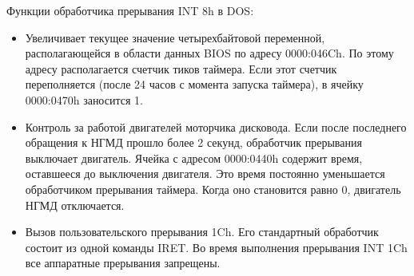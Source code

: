 Функции обработчика прерывания INT 8h в DOS:

\begin{itemize}
	\item Увеличивает текущее значение четырехбайтовой переменной, располагающейся в области данных BIOS по адресу 0000:046Ch. По этому адресу располагается счетчик тиков таймера. Если этот счетчик переполняется (после 24 часов с момента запуска таймера), в ячейку 0000:0470h заносится 1.
	\item Контроль за работой двигателей моторчика дисковода. Если после последнего обращения к НГМД прошло более 2 секунд, обработчик прерывания выключает двигатель. Ячейка с адресом 0000:0440h содержит время, оставшееся до выключения двигателя. Это время постоянно уменьшается обработчиком прерывания таймера. Когда оно становится равно 0, двигатель НГМД отключается.
	\item Вызов пользовательского прерывания 1Ch. Его стандартный обработчик состоит из одной команды IRET. Во время выполнения прерывания INT 1Ch все аппаратные прерывания запрещены.
\end{itemize}
